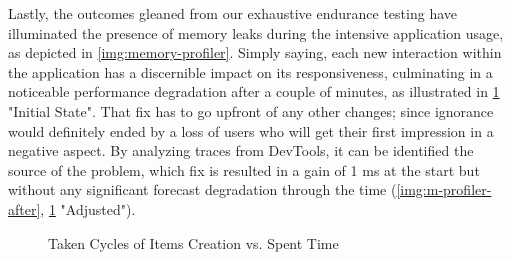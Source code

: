 Lastly, the outcomes gleaned from our exhaustive endurance testing have illuminated the presence of memory 
leaks during the intensive application usage, as depicted in \cref{img:memory-profiler}. Simply saying, each 
new interaction within the application has a discernible impact on its responsiveness, culminating in a noticeable 
performance degradation after a couple of minutes, as illustrated in \cref{gr:taken-cycle} "Initial State". That 
fix has to go upfront of any other changes; since ignorance would definitely ended by a loss of users who will 
get their first impression in a negative aspect. By analyzing traces from DevTools, it can be identified the source 
of the problem, which fix is resulted in a gain of 1 ms at the start but without any significant forecast 
degradation through the time (\cref{img:m-profiler-after}, \cref{gr:taken-cycle} "Adjusted").


\begin{figure}
\caption{Taken Cycles of Items Creation vs. Spent Time} \label{gr:taken-cycle}
\end{figure}

